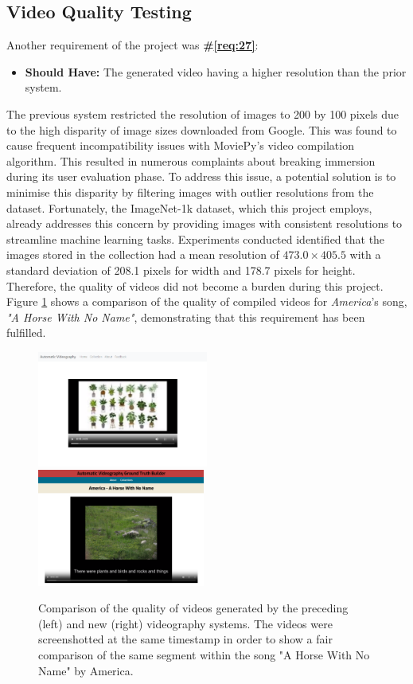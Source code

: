 \documentclass{l4proj}
\begin{document}
\subsection{Video Quality Testing}
Another requirement of the project was \textbf{\#\ref{req:27}}:

\begin{itemize}
    \item \textbf{Should Have:} The generated video having a higher resolution than the prior system.
\end{itemize}

The previous system restricted the resolution of images to 200 by 100 pixels due to the high disparity of image sizes downloaded from Google. This was found to cause frequent incompatibility issues with MoviePy's video compilation algorithm. This resulted in numerous complaints about breaking immersion during its user evaluation phase. To address this issue, a potential solution is to minimise this disparity by filtering images with outlier resolutions from the dataset. Fortunately, the ImageNet-1k dataset, which this project employs, already addresses this concern by providing images with consistent resolutions to streamline machine learning tasks. Experiments conducted identified that the images stored in the collection had a mean resolution of $473.0 \times 405.5$ with a standard deviation of 208.1 pixels for width and 178.7 pixels for height. Therefore, the quality of videos did not become a burden during this project. Figure \ref{fig:video_quality_comp} shows a comparison of the quality of compiled videos for \emph{America}'s song, \emph{"A Horse With No Name"}, demonstrating that this requirement has been fulfilled.

\begin{figure}
    \centering
    \includegraphics[width=0.5\textwidth]{figures/ahwnn_quality_p.pdf}
    \includegraphics[width=0.49\textwidth]{figures/ahwnn_quality_c.pdf}
    \caption{Comparison of the quality of videos generated by the preceding (left) and new (right) videography systems. The videos were screenshotted at the same timestamp in order to show a fair comparison of the same segment within the song "A Horse With No Name" by America.}
    \label{fig:video_quality_comp}
\end{figure}
\end{document}
